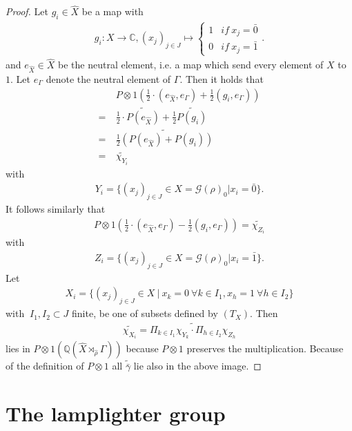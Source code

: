 \documentclass[12pt,a4paper]{scrartcl}
\theoremstyle{plain}
\theoremstyle{definition}
\numberwithin{equation}{section}
\newcommand{\C}{\mathbb{C}} %
\newcommand{\Q}{\mathbb{Q}} %
\newcommand{\2}{\mathbb{Z} / 2 \mathbb{Z}}
\newcommand{\G}{\mathcal{G}}
\newcommand{\1}{\bar{1}}
\newcommand{\0}{\bar{0}}
\begin{document}
\begin{proof}
	Let $g_i \in \hat{X}$ be a map with
	\begin{align*}
		g_i\colon X \to \C, (x_j)_{j \in J} \mapsto \begin{cases}
			1 & if \ x_j = \0 \\
			0 & if \ x_j = \1
		\end{cases}.
	\end{align*} 
	and $e_{\hat{X}} \in \hat{X}$ be the neutral element, i.e. a map which send every element of $X$ to $1$. Let $e_{\Gamma}$ denote the neutral element of $\Gamma$. Then it holds that
	\begin{align*}
		 &~ P \otimes 1(\frac{1}{2} \cdot (e_{\hat{X}}, e_{\Gamma}) + \frac{1}{2}(g_i, e_{\Gamma})) \\
		=&~ \frac{1}{2} \cdot \widetilde{P(e_{\hat{X}})} + \frac{1}{2} \widetilde{P(g_i)} \\
		=&~ \widetilde{\frac{1}{2}(P(e_{\hat{X}}) + P(g_i))} \\
		=&~ \tilde{\chi_{Y_i}}
	\end{align*}
	with
	\begin{align*}
		Y_i = \{(x_j)_{j \in J} \in X = \G (\rho)_0| x_i = \0\}.
	\end{align*} 
	It follows similarly that 
	\begin{align*}
		P \otimes 1(\frac{1}{2} \cdot (e_{\hat{X}}, e_{\Gamma}) - \frac{1}{2}(g_i, e_{\Gamma})) = \tilde{\chi_{Z_i}}
	\end{align*}
	with
	\begin{align*}
		Z_i = \{(x_j)_{j \in J} \in X = \G (\rho)_0| x_i = \1\}.
	\end{align*}
	Let 
	\begin{align*}
		X_i = \{(x_j)_{j \in J} \in X \ | \ x_k = 0 \ \forall k \in I_1, x_h = 1 \ \forall h \in I_2 \}
	\end{align*}
	with $\ I_1, I_2 \subset J$ finite, be one of subsets defined by $(T_X)$. Then 
	\begin{align*}
		\widetilde{\chi_{X_i}} = \widetilde{\Pi_{k \in I_1} \chi_{Y_k} \cdot \Pi_{h \in I_2} \chi_{Z_h}}
	\end{align*}
	lies in $P \otimes 1(\Q (\hat{X} \rtimes_{\hat{\rho}} \Gamma))$ because $P \otimes 1$ preserves the multiplication. Because of the definition of $P \otimes 1$ all $\tilde{\bar{\gamma}}$ lie also in the above image.
\end{proof}

\section{The lamplighter group} \label{chlamplighter}
\end{document}
